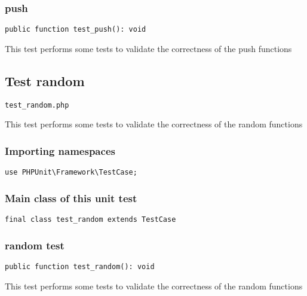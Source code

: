 \documentclass[a4paper]{article}
\begin{document}
\hypertarget{toc310}{}
\subsubsection{push}

\begin{lstlisting}
public function test_push(): void
\end{lstlisting}

This test performs some tests to validate the correctness
of the push functions

\hypertarget{toc311}{}
\subsection{Test random}

\begin{lstlisting}
test_random.php
\end{lstlisting}

This test performs some tests to validate the correctness
of the random functions

\hypertarget{toc312}{}
\subsubsection{Importing namespaces}

\begin{lstlisting}
use PHPUnit\Framework\TestCase;
\end{lstlisting}

\hypertarget{toc313}{}
\subsubsection{Main class of this unit test}

\begin{lstlisting}
final class test_random extends TestCase
\end{lstlisting}

\hypertarget{toc314}{}
\subsubsection{random test}

\begin{lstlisting}
public function test_random(): void
\end{lstlisting}

This test performs some tests to validate the correctness
of the random functions

\hypertarget{toc315}{}
\end{document}
